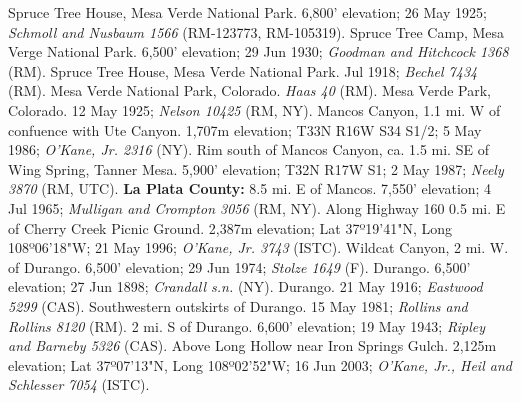 Spruce Tree House, Mesa Verde National Park. 6,800' elevation; 26 May 1925;
\textit{Schmoll and Nusbaum 1566} (RM-123773, RM-105319).
Spruce Tree Camp, Mesa Verge National Park. 6,500' elevation; 29 Jun 1930;
\textit{Goodman and Hitchcock 1368} (RM).
Spruce Tree House, Mesa Verde National Park. Jul 1918; \textit{Bechel 7434} (RM).
Mesa Verde National Park, Colorado. \textit{Haas 40} (RM).
Mesa Verde Park, Colorado. 12 May 1925; \textit{Nelson 10425} (RM, NY).
Mancos Canyon, 1.1 mi. W of confuence with Ute Canyon. 1,707m elevation;
T33N R16W S34 S1/2; 5 May 1986; \textit{O'Kane, Jr. 2316} (NY).
Rim south of Mancos Canyon, ca. 1.5 mi. SE of Wing Spring, Tanner Mesa.
5,900' elevation; T32N R17W S1; 2 May 1987; \textit{Neely 3870} (RM, UTC).
  \textbf{La Plata County:}
8.5 mi. E of Mancos. 7,550' elevation; 4 Jul 1965;
\textit{Mulligan and Crompton 3056} (RM, NY).
Along Highway 160 0.5 mi. E of Cherry Creek Picnic Ground. 2,387m elevation;
Lat 37º19'41"N, Long 108º06'18"W; 21 May 1996; \textit{O'Kane, Jr. 3743} (ISTC).
Wildcat Canyon, 2 mi. W. of Durango. 6,500' elevation; 29 Jun 1974;
\textit{Stolze 1649} (F).
Durango. 6,500' elevation; 27 Jun 1898; \textit{Crandall s.n.} (NY).
Durango. 21 May 1916; \textit{Eastwood 5299} (CAS).
Southwestern outskirts of Durango. 15 May 1981;
\textit{Rollins and Rollins 8120} (RM).
2 mi. S of Durango. 6,600' elevation; 19 May 1943;
\textit{Ripley and Barneby 5326} (CAS).
Above Long Hollow near Iron Springs Gulch. 2,125m elevation;
Lat 37º07'13"N, Long 108º02'52"W; 16 Jun 2003;
\textit{O'Kane, Jr., Heil and Schlesser 7054} (ISTC).

